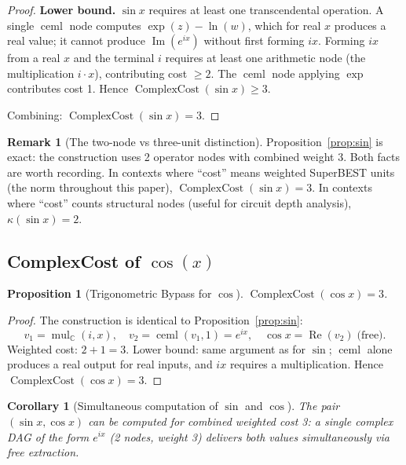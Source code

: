 \documentclass[12pt,a4paper]{article}
\newtheorem{corollary}[theorem]{Corollary}
\newtheorem{proposition}[theorem]{Proposition}
\theoremstyle{definition}
\newtheorem{remark}[theorem]{Remark}
\newcommand{\ceml}{\operatorname{ceml}}
\newcommand{\CC}{\operatorname{ComplexCost}}
\begin{document}
\begin{proof}
\medskip
\noindent\textbf{Lower bound.}
$\sin x$ requires at least one transcendental operation.
A single $\ceml$ node computes $\exp(z) - \ln(w)$, which for real $x$ produces
a real value; it cannot produce $\operatorname{Im}(e^{ix})$ without first
forming $ix$.
Forming $ix$ from a real $x$ and the terminal $i$ requires at least one
arithmetic node (the multiplication $i \cdot x$), contributing cost $\geq 2$.
The $\ceml$ node applying $\exp$ contributes cost 1.
Hence $\CC(\sin x) \geq 3$.

Combining: $\CC(\sin x) = 3$.
\end{proof}

\begin{remark}[The two-node vs three-unit distinction]
Proposition~\ref{prop:sin} is exact: the construction uses 2 operator nodes
with combined weight 3.  Both facts are worth recording.  In contexts where
``cost'' means weighted SuperBEST units (the norm throughout this paper),
$\CC(\sin x) = 3$.  In contexts where ``cost'' counts structural nodes (useful
for circuit depth analysis), $\kappa(\sin x) = 2$.
\end{remark}

\subsection{ComplexCost of $\cos(x)$}

\begin{proposition}[Trigonometric Bypass for $\cos$]
\label{prop:cos}
$\CC(\cos x) = 3$.
\end{proposition}

\begin{proof}
The construction is identical to Proposition~\ref{prop:sin}:
\[
  v_1 = \operatorname{mul}_{\mathbb{C}}(i, x), \quad
  v_2 = \ceml(v_1, 1) = e^{ix}, \quad
  \cos x = \operatorname{Re}(v_2) \;\text{(free)}.
\]
Weighted cost: $2 + 1 = 3$.
Lower bound: same argument as for $\sin$; $\ceml$ alone produces a real output
for real inputs, and $ix$ requires a multiplication.
Hence $\CC(\cos x) = 3$.
\end{proof}

\begin{corollary}[Simultaneous computation of $\sin$ and $\cos$]
\label{cor:sincos-simultaneous}
The pair $(\sin x, \cos x)$ can be computed for combined weighted cost 3:
a single complex DAG of the form $e^{ix}$ (2 nodes, weight 3) delivers both
values simultaneously via free extraction.
\end{corollary}
\end{document}
